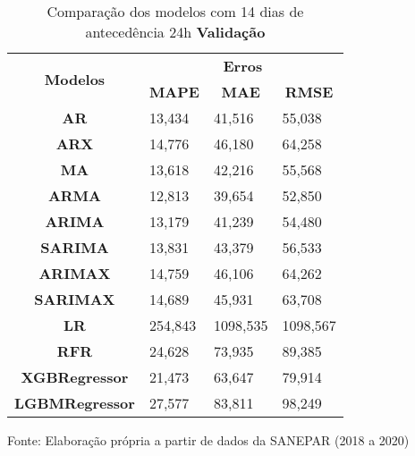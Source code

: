 \begin{table}[H]
	\centering
	\caption{Comparação dos modelos com 14 dias de antecedência 24h \textbf{Validação} }\label{tb:30-24vld}
	\begin{tabular}{@{}clll@{}}
		\toprule
		\multirow{2}{*}{\textbf{Modelos}} & \multicolumn{3}{c}{\textbf{Erros}}                                                                       \\ \cmidrule(l){2-4} 
		& \multicolumn{1}{c}{\textbf{MAPE}} & \multicolumn{1}{c}{\textbf{MAE}} & \multicolumn{1}{c}{\textbf{RMSE}} \\ \hline
\textbf{AR}                       & 13,434                            & 41,516                           & 55,038                            \\
\textbf{ARX}                      & 14,776                            & 46,180                           & 64,258                            \\
\textbf{MA}                       & 13,618                            & 42,216                           & 55,568                            \\
\textbf{ARMA}                     & 12,813                            & 39,654                           & 52,850                            \\
\textbf{ARIMA}                    & 13,179                            & 41,239                           & 54,480                            \\
\textbf{SARIMA}                   & 13,831                            & 43,379                           & 56,533                            \\
\textbf{ARIMAX}                   & 14,759                            & 46,106                           & 64,262                            \\
\textbf{SARIMAX}                  & 14,689                            & 45,931                           & 63,708                            \\
\textbf{LR}        & 254,843                           & 1098,535                         & 1098,567                          \\
\textbf{RFR}  & 24,628                            & 73,935                           & 89,385                            \\
\textbf{XGBRegressor}             & 21,473                            & 63,647                           & 79,914                            \\
\textbf{LGBMRegressor}            & 27,577                            & 83,811                           & 98,249                            \\ \bottomrule
	\end{tabular}

Fonte: Elaboração própria a partir de dados da SANEPAR (2018 a 2020)
\end{table}

